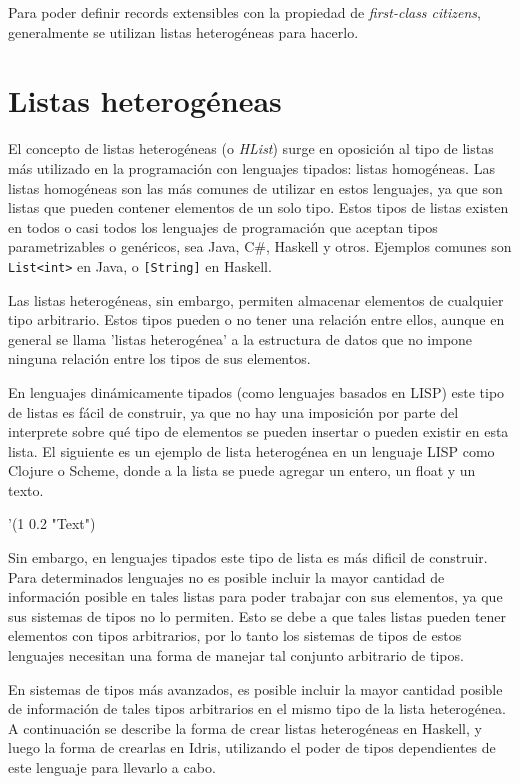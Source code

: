 Para poder definir records extensibles con la propiedad de \textit{first-class citizens}, generalmente se utilizan listas heterogéneas para hacerlo.

\section{Listas heterogéneas}

El concepto de listas heterogéneas (o \textit{HList}) surge en oposición al tipo de listas más utilizado en la programación con lenguajes tipados: listas homogéneas. Las listas homogéneas son las más comunes de utilizar en estos lenguajes, ya que son listas que pueden contener elementos de un solo tipo.
Estos tipos de listas existen en todos o casi todos los lenguajes de programación que aceptan tipos parametrizables o genéricos, sea Java, C\#, Haskell y otros. Ejemplos comunes son \texttt{List<int>} en Java, o \texttt{[String]} en Haskell.

Las listas heterogéneas, sin embargo, permiten almacenar elementos de cualquier tipo arbitrario. Estos tipos pueden o no tener una relación entre ellos, aunque en general se llama 'listas heterogénea' a la estructura de datos que no impone ninguna relación entre los tipos de sus elementos.

En lenguajes dinámicamente tipados (como lenguajes basados en LISP) este tipo de listas es fácil de construir, ya que no hay una imposición por parte del interprete sobre qué tipo de elementos se pueden insertar o pueden existir en esta lista. El siguiente es un ejemplo de lista heterogénea en un lenguaje LISP como Clojure o Scheme, donde a la lista se puede agregar un entero, un float y un texto.

\begin{code}
'(1 0.2 "Text")
\end{code}

Sin embargo, en lenguajes tipados este tipo de lista es más dificil de construir. Para determinados lenguajes no es posible incluir la mayor cantidad de información posible en tales listas para poder trabajar con sus elementos, ya que sus sistemas de tipos no lo permiten. Esto se debe a que tales listas pueden tener elementos con tipos arbitrarios, por lo tanto los sistemas de tipos de estos lenguajes necesitan una forma de manejar tal conjunto arbitrario de tipos.

En sistemas de tipos más avanzados, es posible incluir la mayor cantidad posible de información de tales tipos arbitrarios en el mismo tipo de la lista heterogénea. 
A continuación se describe la forma de crear listas heterogéneas en Haskell, y luego la forma de crearlas en Idris, utilizando el poder de tipos dependientes de este lenguaje para llevarlo a cabo.

